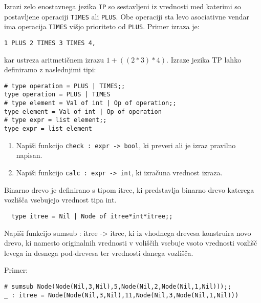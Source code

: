 \begin{ex}
   Izrazi zelo enostavnega jezika \lstinline{TP} so sestavljeni iz
   vrednosti med katerimi so postavljene operaciji \lstinline{TIMES} ali
   \lstinline{PLUS}. Obe operaciji sta levo asociativne vendar ima
   operacija \lstinline{TIMES} vi\v sjo prioriteto od
   \lstinline{PLUS}. Primer izraza je:

\begin{lstlisting}
1 PLUS 2 TIMES 3 TIMES 4,
\end{lstlisting}

   kar ustreza aritmeti\v cnem izrazu $1 + ((2 * 3) * 4)$. Izraze jezika
   TP lahko definiramo z naslednjimi tipi:
 
 \begin{lstlisting}
# type operation = PLUS | TIMES;; 
type operation = PLUS | TIMES 
# type element = Val of int | Op of operation;; 
type element = Val of int | Op of operation
# type expr = list element;;
type expr = list element
\end{lstlisting}

   \begin{enumerate}[label=(\roman*)]
   \item Napi\v si funkcijo \lstinline{check : expr -> bool}, ki preveri
     ali je izraz pravilno napisan.

   \item Napi\v si funkcijo \lstinline{calc : expr -> int}, ki izra\v
     cuna vrednost izraza.
   \end{enumerate}


\end{ex}
\begin{ex}
  Binarno drevo je definirano s tipom itree, ki predstavlja binarno
  drevo katerega vozli\v s\v ca vsebujejo vrednost tipa int.
\begin{lstlisting}
  type itree = Nil | Node of itree*int*itree;;
\end{lstlisting}

  Napi\v si funkcijo sumsub : itree -> itree, ki iz vhodnega drevesa
  konstruira novo drevo, ki namesto originalnih vrednosti v voli\v s\v
  cih vsebuje vsoto vrednosti vozli\v s\v c levega in desnega
  pod-drevesa ter vrednosti danega vozli\v s\v ca.

\noindent\/Primer:
\begin{lstlisting}
# sumsub Node(Node(Nil,3,Nil),5,Node(Nil,2,Node(Nil,1,Nil)));;
_ : itree = Node(Node(Nil,3,Nil),11,Node(Nil,3,Node(Nil,1,Nil)))
\end{lstlisting}


\end{ex} 
